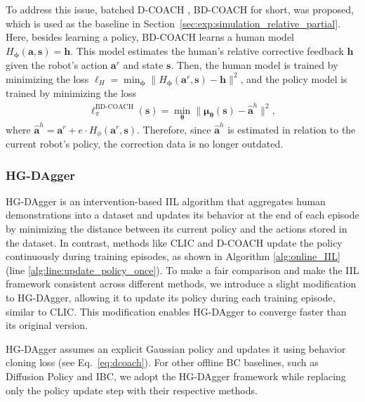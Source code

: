 To address this issue, batched D-COACH \cite{2021_BDCOACH}, \mbox{BD-COACH} for short, was proposed, which is used as the baseline in Section~\ref{sec:exp:simulation_relative_partial}. Here, besides learning a policy,
\mbox{BD-COACH} learns a human model $H_{\bm \phi}(\bm a, \bm s) = \bm h$. This model estimates the human's relative corrective feedback $\bm h$ given the robot's action $\bm a^r$ and state $\bm s$.
Then, the human model is trained by minimizing the loss 
$
    \ell_H = \min_{\bm \phi}{ \| H_{\bm \phi}(\bm a^r, \bm s) - \bm h \|^2}
$,
 and the policy model is trained by minimizing the loss 
\begin{align*}
\ell_{\pi}^{\text{BD-COACH}}(\bm s) = \min_{\bm \theta}{ \| \bm \mu_{\bm \theta}(\bm s) - \hat {\bm a}^{h} \|^2},
\end{align*}
where $\hat{\bm a}^{h} = \bm a^r+ e \cdot  H_{\phi}(\bm a^r , \bm s)$. 
Therefore, since $\hat{\bm a}^{h}$ is estimated in relation to the current robot's policy, the correction data is no longer outdated. 
\subsubsection{HG-DAgger}
\label{appendix:HGDAgger}
HG-DAgger is an intervention-based IIL algorithm that aggregates human demonstrations into a dataset and updates its behavior at the end of each episode by minimizing the distance between its current policy and the actions stored in the dataset.
In contrast, methods like CLIC and D-COACH update the policy continuously during training episodes, as shown in Algorithm \ref{alg:online_IIL} (line \ref{alg:line:update_policy_once}).
To make a fair comparison and make the IIL framework consistent across different methods, we introduce a slight modification to HG-DAgger,  allowing it to update its policy during each training episode, similar to CLIC. 
This modification enables HG-DAgger to converge faster than its original version. 

HG-DAgger assumes an explicit Gaussian policy and updates it using behavior cloning loss (see Eq.~\eqref{eq:dcoach}). For other offline BC baselines, such as Diffusion Policy and IBC, we adopt the HG-DAgger framework while replacing only the policy update step with their respective methods.
